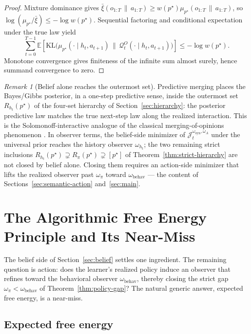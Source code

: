 \documentclass[11pt]{article}
\theoremstyle{definition}
\theoremstyle{remark}
\newtheorem{remark}[theorem]{Remark}
\newcommand{\Qcal}{\mathcal{Q}}
\newcommand{\E}{\mathbb{E}}
\newcommand{\KL}{\mathrm{KL}}
\newcommand{\givena}{\,\|\,}
\newcommand{\barxi}{\bar{\xi}}
\begin{document}
\begin{proof}
Mixture dominance gives $\barxi(o_{1:T}\givena a_{1:T})\ge w(p^\star)\mu_{p^\star}(o_{1:T}\givena a_{1:T})$, so $\log(\mu_{p^\star}/\barxi)\le -\log w(p^\star)$. Sequential factoring and conditional expectation under the true law yield
\[
\sum_{t=0}^{T-1}\E\!\left[\KL\!\bigl(\mu_{p^\star}(\cdot\mid h_t,a_{t+1})\,\|\,\Qcal_t^O(\cdot\mid h_t,a_{t+1})\bigr)\right]
\le -\log w(p^\star).
\]
Monotone convergence gives finiteness of the infinite sum almost surely, hence summand convergence to zero.
\end{proof}

\begin{remark}[Belief alone reaches the outermost set]
\label{rem:belief-reaches-Rht}
Predictive merging places the Bayes/Gibbs posterior, in a one-step predictive sense, inside the outermost set $R_{h_t}(p^\star)$ of the four-set hierarchy of Section~\ref{sec:hierarchy}: the posterior predictive law matches the true next-step law along the realized interaction. This is the Solomonoff-interactive analogue of the classical merging-of-opinions phenomenon \citep{BlackwellDubins1962}. In observer terms, the belief-side minimizer of $\mathcal J_t^{\omega_{\mathrm{syn}},\omega_A}$ under the universal prior reaches the history observer $\omega_{h_t}$; the two remaining strict inclusions $R_{h_t}(p^\star)\supsetneq R_\pi(p^\star)\supsetneq[p^\star]$ of Theorem~\ref{thm:strict-hierarchy} are not closed by belief alone. Closing them requires an action-side minimizer that lifts the realized observer past $\omega_\pi$ toward $\omega_{\mathrm{behav}}$ --- the content of Sections~\ref{sec:semantic-action} and~\ref{sec:main}.
\end{remark}

\section{The Algorithmic Free Energy Principle and Its Near-Miss}
\label{sec:near-miss}

The belief side of Section~\ref{sec:belief} settles one ingredient. The remaining question is action: does the learner's realized policy induce an observer that refines toward the behavioral observer $\omega_{\mathrm{behav}}$, thereby closing the strict gap $\omega_\pi<\omega_{\mathrm{behav}}$ of Theorem~\ref{thm:policy-gap}? The natural generic answer, expected free energy, is a near-miss.

\subsection{Expected free energy}
\end{document}
